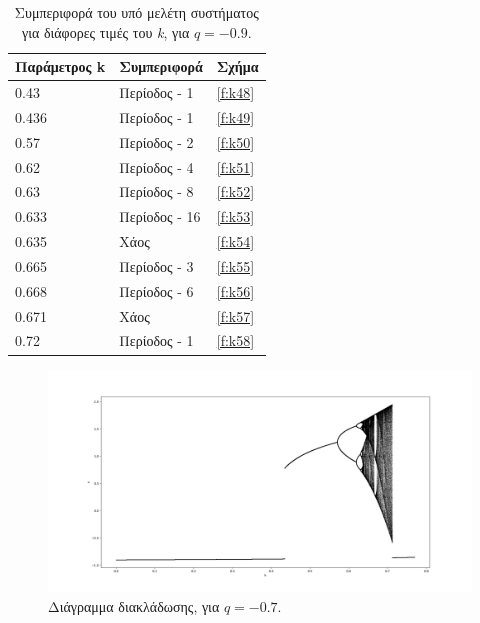 \begin{table}[ht]
	\centering
	\caption{ Συμπεριφορά του υπό μελέτη συστήματος για διάφορες τιμές του \emph{k}, για $q=-0.9$.}
	\label{tab:abc4}
	\begin{tabular}{l | l | l}
		Παράμετρος k & Συμπεριφορά & Σχήμα\\
		\hline
		0.43 &  Περίοδος -  1 & \ref{f:k48}\\
		0.436 &  Περίοδος -  1 & \ref{f:k49}\\
		0.57& Περίοδος -  2 & \ref{f:k50}\\
		0.62& Περίοδος -  4 & \ref{f:k51}\\
		0.63 &  Περίοδος -  8 & \ref{f:k52}\\
		0.633& Περίοδος -  16 & \ref{f:k53}\\
		0.635& Χάος & \ref{f:k54}\\
		0.665 & Περίοδος -  3 & \ref{f:k55}\\
		0.668 & Περίοδος -  6 & \ref{f:k56}\\
		0.671 & Χάος & \ref{f:k57}\\
		0.72 & Περίοδος -  1& \ref{f:k58}\\
	\end{tabular}
\end{table}

\begin{figure}[ht]
	\centering
	\includegraphics[width=1\linewidth]{LateX images/graphs q09/g1}
	\caption{ Διάγραμμα διακλάδωσης, για $q=-0.7$.}
	\label{f:g14}
\end{figure}

